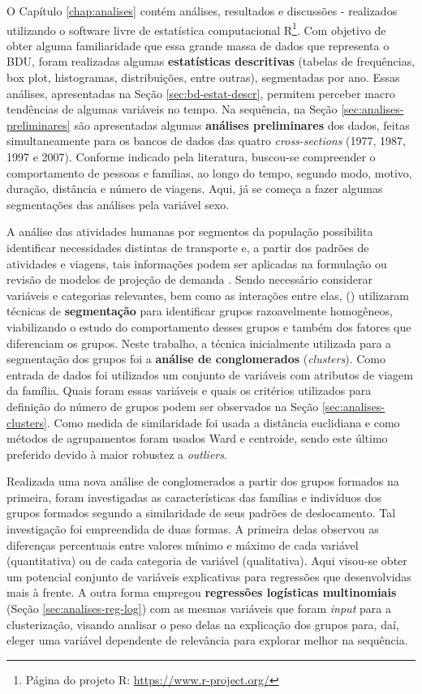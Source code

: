 O Capítulo \ref{chap:analises} contém análises, resultados e discussões - realizados utilizando o software livre de estatística computacional R\footnote{Página do projeto R: \url{https://www.r-project.org/}}.
Com objetivo de obter alguma familiaridade que essa grande massa de dados que representa o BDU, foram realizadas algumas \textbf{estatísticas descritivas} (tabelas de frequências, box plot, histogramas, distribuições, entre outras), segmentadas por ano. Essas análises, apresentadas na Seção \ref{sec:bd-estat-descr}, permitem perceber macro tendências de algumas variáveis no tempo.
Na sequência, na Seção \ref{sec:analises-preliminares} são apresentadas algumas \textbf{análises preliminares} dos dados, feitas simultaneamente para os bancos de dados das quatro \emph{cross-sections} (1977, 1987, 1997 e 2007). 
Conforme indicado pela literatura, buscou-se compreender o comportamento de pessoas e famílias, ao longo do tempo, segundo modo, motivo, duração, distância e número de viagens. Aqui, já se começa a fazer algumas segmentações das análises pela variável sexo.

A análise das atividades humanas por segmentos da população possibilita identificar necessidades distintas de transporte e, a partir dos padrões de atividades e viagens, tais informações podem ser aplicadas na formulação ou revisão de modelos de projeção de demanda \cite{MAHMASSANI1988}.
Sendo necessário considerar variáveis e categorias relevantes, bem como as interações entre elas,  (\citeyear{STRAMBI1998}) utilizaram técnicas de \textbf{segmentação} para identificar grupos razoavelmente homogêneos, viabilizando o estudo do comportamento desses grupos e também dos fatores que diferenciam os grupos.
Neste trabalho, a técnica inicialmente utilizada para a segmentação dos grupos foi a \textbf{análise de conglomerados} (\textit{clusters}).
Como entrada de dados foi utilizados um conjunto de variáveis com atributos de viagem da família. 
Quais foram essas variáveis e quais os critérios utilizados para definição do número de grupos podem ser observados na Seção \ref{sec:analises-clusters}.
Como medida de similaridade foi usada a distância euclidiana e como métodos de agrupamentos foram usados Ward e centroide, sendo este último preferido devido à maior robustez a \textit{outliers}.

Realizada uma nova análise de conglomerados a partir dos grupos formados na primeira, foram investigadas as características das famílias e indivíduos dos grupos formados segundo a similaridade de seus padrões de deslocamento.
Tal investigação foi empreendida de duas formas. 
A primeira delas observou as diferenças percentuais entre valores mínimo e máximo de cada variável (quantitativa) ou de cada categoria de variável (qualitativa).
Aqui visou-se obter um potencial conjunto de variáveis explicativas para regressões que desenvolvidas mais à frente.
A outra forma empregou \textbf{regressões logísticas multinomiais} (Seção \ref{sec:analises-reg-log}) com as mesmas variáveis que foram \textit{input} para a clusterização, visando analisar o peso delas na explicação dos grupos para, daí, eleger uma variável dependente de relevância para explorar melhor na sequência.

